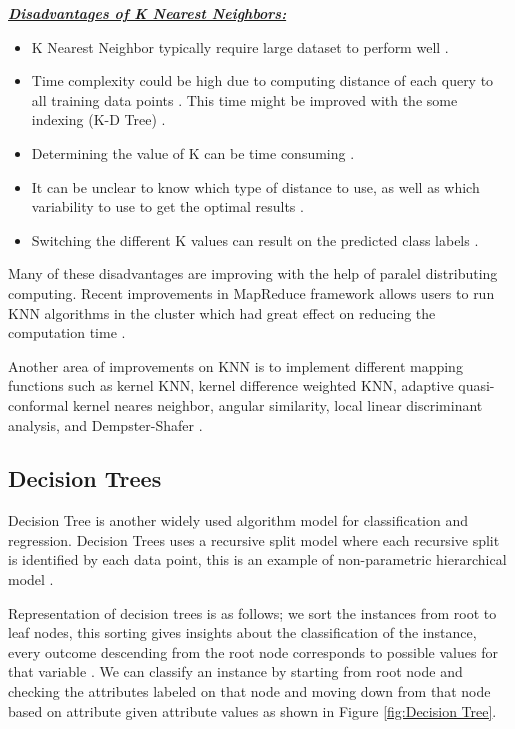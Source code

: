 \documentclass[sigconf]{acmart}
\begin{document}
\textbf{\underline{\textit{Disadvantages of K Nearest Neighbors:}}}

\begin{itemize}
\item K Nearest Neighbor typically require large dataset to perform well \cite{www-cs.man}. 
\item Time complexity could be high due to computing distance of each query to all training data points \cite{www-revoledu}. This time might be improved with the some indexing (K-D Tree) \cite{www-revoledu}.
\item Determining the value of K can be time consuming \cite{www-revoledu}. 
\item It can be unclear to know which type of distance to use, as well as which variability to use to get the optimal results \cite{www-revoledu}. 
\item Switching the different K values can result on the predicted class labels \cite{www-nickgillian}. 
\end{itemize}

Many of these disadvantages are improving with the help of paralel distributing computing. Recent improvements in MapReduce framework allows users to run KNN algorithms in the cluster which had great effect on reducing the computation time \cite{knn-chung}.

\par Another area of improvements on KNN is to implement different mapping functions such as kernel KNN, kernel difference weighted KNN, adaptive quasi-conformal kernel neares neighbor, angular similarity, local linear discriminant analysis, and Dempster-Shafer \cite{ERTUGRUL2017480}. 

\subsection{Decision Trees}
 
Decision Tree is another widely used algorithm model  for classification and regression. Decision Trees uses a recursive split model where each recursive split is identified by each data point, this is an example of non-parametric hierarchical model \cite{HASSAN201752}. 
\par Representation of decision trees is as follows; we sort the instances from root to leaf nodes, this sorting gives insights about the classification of the instance, every outcome descending from the root node corresponds to possible values for that variable \cite{www-cs.princeton}. We can classify an instance by starting from root node and checking the attributes labeled on that node and moving down from that node based on attribute given attribute values \cite{www-cs.princeton} as shown in Figure \ref{fig:Decision Tree}. 
\end{document}

